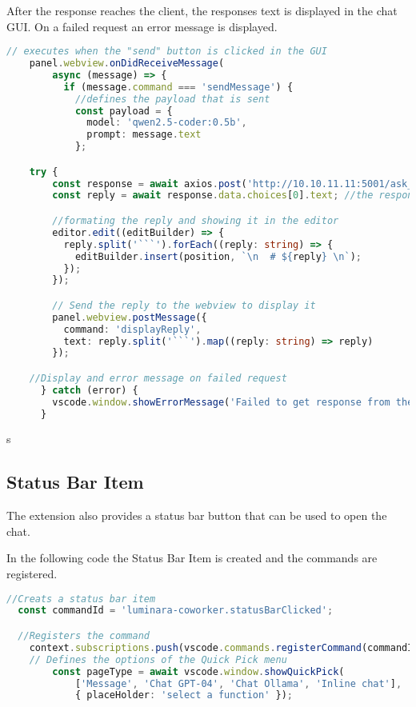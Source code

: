 After the response reaches the client, the responses text is displayed in the chat GUI.
On a failed request an error message is displayed.

\begin{lstlisting}[language=TypeScript, caption={Axios request}]
    // executes when the "send" button is clicked in the GUI
    panel.webview.onDidReceiveMessage(
        async (message) => {
          if (message.command === 'sendMessage') {
            //defines the payload that is sent
            const payload = {
              model: 'qwen2.5-coder:0.5b',
              prompt: message.text
            };  

    try {
        const response = await axios.post('http://10.10.11.11:5001/ask_programming_bot', payload ); //Selecting the endpoint for the request and sending the payload. 
        const reply = await response.data.choices[0].text; //the response is then stored in the "reply" variable

        //formating the reply and showing it in the editor
        editor.edit((editBuilder) => {
          reply.split('```').forEach((reply: string) => {
            editBuilder.insert(position, `\n  # ${reply} \n`);
          });
        });

        // Send the reply to the webview to display it
        panel.webview.postMessage({
          command: 'displayReply',
          text: reply.split('```').map((reply: string) => reply)
        });

    //Display and error message on failed request
      } catch (error) {
        vscode.window.showErrorMessage('Failed to get response from the server.');
      }

\end{lstlisting}s

\subsection{Status Bar Item} 

The extension also provides a status bar button that can be used to open the chat.

In the following code the Status Bar Item is created and the commands are registered.

\begin{lstlisting}[language=TypeScript, caption={Status Bar}]
  //Creats a status bar item
  const commandId = 'luminara-coworker.statusBarClicked';

  //Registers the command
	context.subscriptions.push(vscode.commands.registerCommand(commandId, async () => {
    // Defines the options of the Quick Pick menu
		const pageType = await vscode.window.showQuickPick(
			['Message', 'Chat GPT-04', 'Chat Ollama', 'Inline chat'],
			{ placeHolder: 'select a function' });
\end{lstlisting}

